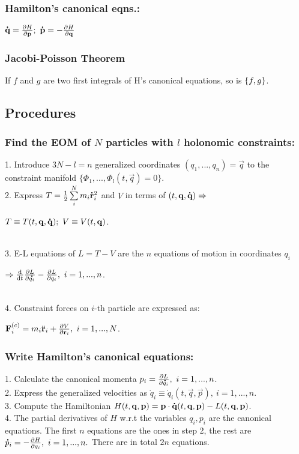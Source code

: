 \subsubsection*{Hamilton's canonical eqns.:} $\dotv{q}=\partials{H}{\vec{p}}(t,\vec{q},\vec{p});\ \dotv{p}=-\partials{H}{\vec{q}}(t,\vec{q},\vec{p})$
\subsubsection*{Jacobi-Poisson Theorem}
If $f$ and $g$ are two first integrals of H's canonical equations, so is $\acomm{f}{g}$.


\subsection{Procedures}
\subsubsection*{Find the EOM of $N$ particles with $l$ holonomic constraints:}
1. Introduce $3N-l=n$ generalized coordinates $(q_{1},...,q_{n})=\vec{q}$ to the constraint manifold $\{\Phi_{1},...,\Phi_{l}(t,\vec{q})=0\}$.\\
2. Express $T=\frac{1}{2}\sum\limits_{i}^{N}m_{i}\accentset{\mbox{\bfseries .}}{\mathbf{r}}_{i}^{2}$ and $V$ in terms of $(t,\mathbf{q},\accentset{\mbox{\bfseries .}}{\mathbf{q}})\Rightarrow $\\
\centerline{$T\equiv T(t,\mathbf{q},\accentset{\mbox{\bfseries .}}{\mathbf{q}});\ V\equiv V(t,\mathbf{q})$.}\\
3. E-L equations of $L=T-V$ are the $n$ equations of motion in coordinates $q_{i}$\\
\centerline{$\then \ELt{L}{{q}_{i}},\ i=1,...,n$.}\\
4. Constraint forces on $i$-th particle are expressed as:\\
\centerline{$\vec{F}_{i}^{(c)}=m_{i}\ddot{\vec{r}}_{i}+\partials{V}{\vec{r}_{i}},\ i=1,...,N$.}

\subsubsection*{Write Hamilton's canonical equations:}
1. Calculate the canonical momenta $p_{i}=\partials{L}{\dot{q}_{i}}(t,\vec{q},\dotv{q}),\ i=1,...,n$.\\
2. Express the generalized velocities as $\dot{q}_{i}\equiv\dot{q}_{i}(t,\vec{q},\vec{p}),\ i=1,...,n$. \\
3. Compute the Hamiltonian $H(t,\mathbf{q},\mathbf{p})=\mathbf{p}\cdot\accentset{\mbox{\bfseries .}}{\mathbf{q}}(t,\mathbf{q},\mathbf{p})-L(t,\mathbf{q},\mathbf{p})$.\\
4. The partial derivatives of $H$ w.r.t the variables $q_{i},p_{i}$ are the canonical equations. The first $n$ equations are the ones in step 2, the rest are $\dot{p}_{i}=-\partials{H}{q_{i}},\ i=1,...,n.$ There are in total $2n$ equations.



